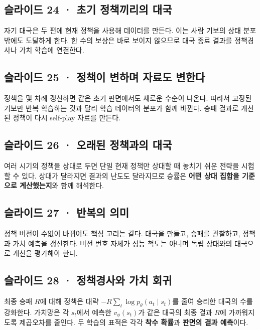 \documentclass[11pt,a4paper]{article}
\begin{document}
\subsection{슬라이드 24 · 초기 정책끼리의 대국}

자기 대국은 두 편에 현재 정책을 사용해 데이터를 만든다. 이는 사람 기보의 상태 분포 밖에도 도달하게 한다. 한 수의 보상은 바로 보이지 않으므로 대국 종료 결과를 정책경사나 가치 학습에 연결한다.\par

\subsection{슬라이드 25 · 정책이 변하며 자료도 변한다}

정책을 몇 차례 갱신하면 같은 초기 판면에서도 새로운 수순이 나온다. 따라서 고정된 기보만 반복 학습하는 것과 달리 학습 데이터의 분포가 함께 바뀐다. 승패 결과로 개선된 정책이 다시 self-play 자료를 만든다.\par

\subsection{슬라이드 26 · 오래된 정책과의 대국}

여러 시기의 정책을 상대로 두면 단일 현재 정책만 상대할 때 놓치기 쉬운 전략을 시험할 수 있다. 상대가 달라지면 결과의 난도도 달라지므로 승률은 \textbf{어떤 상대 집합을 기준으로 계산했는지}와 함께 해석한다.\par

\subsection{슬라이드 27 · 반복의 의미}

정책 버전이 수없이 바뀌어도 핵심 고리는 같다. 대국을 만들고, 승패를 관찰하고, 정책과 가치 예측을 갱신한다. 버전 번호 자체가 성능 척도는 아니며 독립 상대와의 대국으로 개선을 평가해야 한다.\par

\subsection{슬라이드 28 · 정책경사와 가치 회귀}

최종 승패 $R$에 대해 정책은 대략 $-R\sum_t\log p_\theta(a_t\mid s_t)$를 줄여 승리한 대국의 수를 강화한다. 가치망은 각 $s_t$에서 예측한 $v_\phi(s_t)$가 같은 대국의 최종 결과 $R$에 가까워지도록 제곱오차를 줄인다. 두 학습의 표적은 각각 \textbf{착수 확률}과 \textbf{판면의 결과 예측}이다.\par
\end{document}
